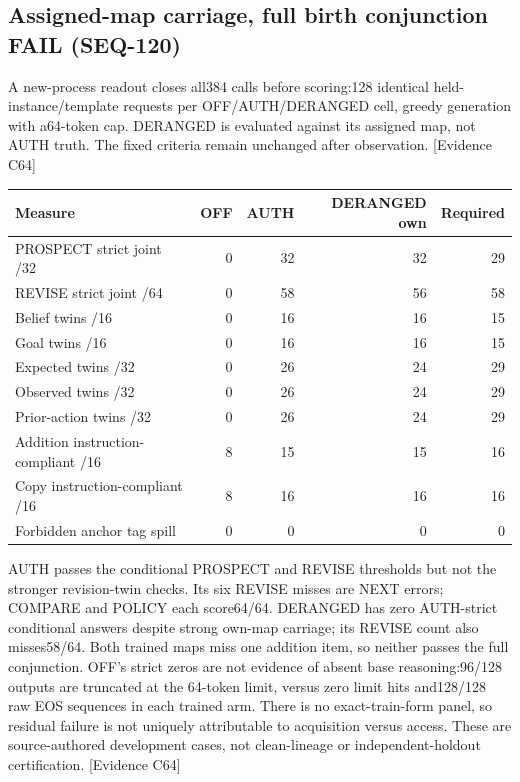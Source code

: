 \documentclass[11pt]{article}
\newcommand{\ev}[1]{\textsf{[Evidence #1]}}
\begin{document}
\subsection{Assigned-map carriage, full birth conjunction FAIL (SEQ-120)}
A new-process readout closes all384 calls before scoring:128 identical
held-instance/template requests per OFF/AUTH/DERANGED cell, greedy generation
with a64-token cap. DERANGED is evaluated against its assigned map, not AUTH
truth. The fixed criteria remain unchanged after observation. \ev{C64}

\begin{center}\small
\begin{tabular}{lrrrr}
\toprule
Measure & OFF & AUTH & DERANGED own & Required \\
\midrule
PROSPECT strict joint /32 & 0 & 32 & 32 & 29 \\
REVISE strict joint /64 & 0 & 58 & 56 & 58 \\
Belief twins /16 & 0 & 16 & 16 & 15 \\
Goal twins /16 & 0 & 16 & 16 & 15 \\
Expected twins /32 & 0 & 26 & 24 & 29 \\
Observed twins /32 & 0 & 26 & 24 & 29 \\
Prior-action twins /32 & 0 & 26 & 24 & 29 \\
Addition instruction-compliant /16 & 8 & 15 & 15 & 16 \\
Copy instruction-compliant /16 & 8 & 16 & 16 & 16 \\
Forbidden anchor tag spill & 0 & 0 & 0 & 0 \\
\bottomrule
\end{tabular}
\end{center}

AUTH passes the conditional PROSPECT and REVISE thresholds but not the stronger revision-twin
checks. Its six REVISE misses are NEXT errors; COMPARE and POLICY each
score64/64. DERANGED has zero AUTH-strict conditional answers despite strong
own-map carriage; its REVISE count also misses58/64. Both trained maps miss
one addition item, so neither passes the full conjunction. OFF's strict zeros
are not evidence of absent base reasoning:96/128 outputs are truncated at the
64-token limit, versus zero limit hits and128/128 raw EOS sequences in each
trained arm. There is no exact-train-form panel, so residual failure is not
uniquely attributable to acquisition versus access. These are source-authored
development cases, not clean-lineage or independent-holdout certification.
\ev{C64}
\end{document}

